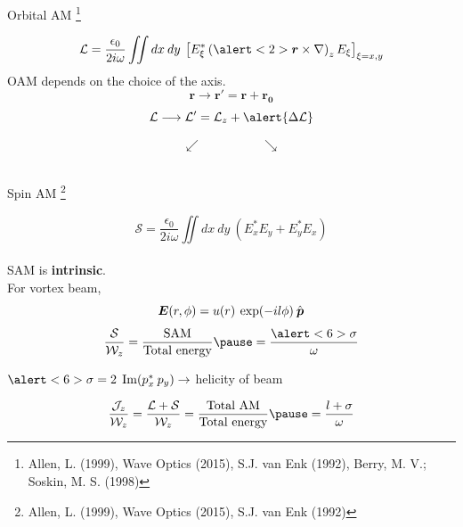 \documentclass[12pt, dvipsnames]{beamer}
\numberwithin{equation}{section}
\newcommand\blfootnote[1]{%
	\begingroup
	\renewcommand\thefootnote{}\footnote{#1}%
	\addtocounter{footnote}{-1}%
	\endgroup
}
\begin{document}
\begin{frame}[t]{Orbital AM}\blfootnote{Allen, L. (1999), Wave Optics (2015), S.J. van Enk (1992), Berry, M. V.; Soskin, M. S. (1998)}%
	\vspace{-9pt}
	$$\mathcal{L}
	= \frac{\epsilon_0}{2i\omega} \iint dx\:dy\:\left[E_\xi^\ast\left(\alert<2>{\boldsymbol{r}}\times\nabla\right)_zE_\xi\right]_{\xi=x,y}$$\pause
	\alert<2>{OAM depends on the choice of the axis.}\pause
	$$\boldsymbol{r}\longrightarrow\boldsymbol{r'}=\boldsymbol{r}+\boldsymbol{r_0}$$\pause\vspace{-8mm}
	$$\mathcal{L}\longrightarrow\mathcal{L'}= \mathcal{L}_z + \alert{\Delta\mathcal{L}}$$\pause\vspace{-8mm}
	
	\begin{center}
		\vspace{-4mm}\pause
		$$\swarrow\hspace{2cm}\searrow$$\\\vspace{-2mm}\pause
		\hspace{1cm}
	\end{center}\pause

\end{frame}

\begin{frame}[t]{Spin AM}\blfootnote{Allen, L. (1999), Wave Optics (2015), S.J. van Enk (1992)}
	$$\mathcal{S}=\frac{\epsilon_0}{2i\omega}\iint dx\:dy\: (E_x^\ast E_y + E_y^\ast E_x)$$\\\pause
	\alert<2>{SAM is \textbf{intrinsic}}.\\\pause
	For vortex beam,
	$$\boldsymbol{E}(r,\phi)= u(r)\:\exp(-il\phi)\:\Hat{\boldsymbol{p}}$$\pause\vspace{-3mm}
	$$\frac{\mathcal{S}}{\mathcal{W}_z} =\frac{\text{SAM}}{\text{Total energy}} \pause = \frac{\alert<6>{\sigma}}{\omega} $$\pause
	
	$\alert<6>{\sigma=2\;\Im(p_x^\ast\: p_y)}\rightarrow$ helicity of beam\pause
	
	$$\frac{\mathcal{J}_z}{\mathcal{W}_z} = \frac{\mathcal{L}+\mathcal{S}}{\mathcal{W}_z} =\frac{\text{Total AM}}{\text{Total energy}} \pause=\frac{l+\sigma}{\omega}$$
\end{frame}
\end{document}
